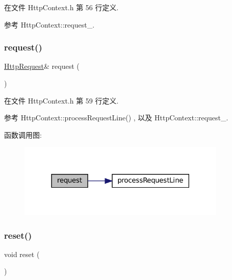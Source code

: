 在文件 Http\+Context.\+h 第 56 行定义.



参考 Http\+Context\+::request\+\_\+.

\mbox{\label{classmuduo_1_1net_1_1HttpContext_a0a2a13410dfd6edfe5c1bb41943bb80d}} 
\subsubsection{\texorpdfstring{request()}{request()}\hspace{0.1cm}{\footnotesize\ttfamily [2/2]}}
{\footnotesize\ttfamily \hyperlink{classmuduo_1_1net_1_1HttpRequest}{Http\+Request}\& request (\begin{DoxyParamCaption}{ }\end{DoxyParamCaption})\hspace{0.3cm}{\ttfamily [inline]}}



在文件 Http\+Context.\+h 第 59 行定义.



参考 Http\+Context\+::process\+Request\+Line() , 以及 Http\+Context\+::request\+\_\+.

函数调用图\+:
\nopagebreak
\begin{figure}[H]
\begin{center}
\leavevmode
\includegraphics[width=282pt]{classmuduo_1_1net_1_1HttpContext_a0a2a13410dfd6edfe5c1bb41943bb80d_cgraph}
\end{center}
\end{figure}
\mbox{\label{classmuduo_1_1net_1_1HttpContext_ad20897c5c8bd47f5d4005989bead0e55}} 
\subsubsection{\texorpdfstring{reset()}{reset()}}
{\footnotesize\ttfamily void reset (\begin{DoxyParamCaption}{ }\end{DoxyParamCaption})\hspace{0.3cm}{\ttfamily [inline]}}



